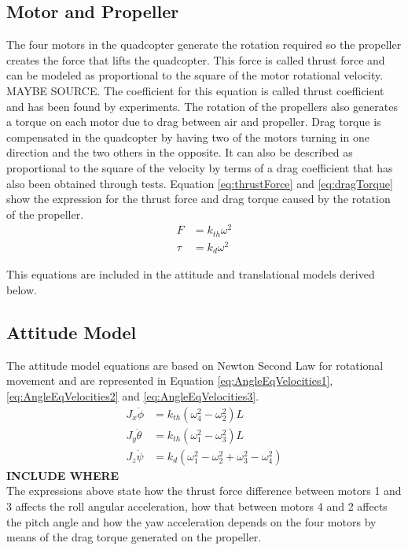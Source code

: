 \subsection{Motor and Propeller}
The four motors in the quadcopter generate the rotation required so the propeller creates the force that lifts the quadcopter. This force is called thrust force and can be modeled as proportional to the square of the motor rotational velocity. MAYBE SOURCE. The coefficient for this equation is called thrust coefficient and has been found by experiments.  
The rotation of the propellers also generates a torque on each motor due to drag between air and propeller. Drag torque is compensated in the quadcopter by having two of the motors turning in one direction and the two others in the opposite. It can also be described as proportional to the square of the velocity by terms of a drag coefficient that has also been obtained through tests.
Equation \ref{eq:thrustForce} and \ref{eq:dragTorque} show the expression for the thrust force and drag torque caused by the rotation of the propeller.
\begin{align}
	F&=k_{th}\omega^2\label{eq:thrustForce}\\
	\tau&=k_{d}\omega^2\label{eq:dragTorque}
\end{align}
\begin{where}
\end{where}
%
This equations are included in the attitude and translational models derived below.
\subsection{Attitude Model}
The attitude model equations are based on Newton Second Law for rotational movement and are represented in Equation \ref{eq:AngleEqVelocities1}, \ref{eq:AngleEqVelocities2} and \ref{eq:AngleEqVelocities3}. 
\begin{align}
	J_x\ddot{\phi}&=k_{th} (\omega^2_4-\omega^2_2)  L \label{eq:AngleEqVelocities1}\\
	J_y \ddot{\theta}&=k_{th} (\omega^2_1-\omega^2_3)  L \label{eq:AngleEqVelocities2} \\
	J_z\ddot{\psi}&=k_d (\omega^2_1-\omega^2_2+\omega^2_3-\omega^2_4)\label{eq:AngleEqVelocities3}
\end{align}
\textbf{INCLUDE WHERE}\\
The expressions above state how the thrust force difference between motors 1 and 3 affects the roll angular acceleration, how that between motors 4 and 2 affects the pitch angle and how the yaw acceleration depends on the four motors by means of the drag torque generated on the propeller.  
